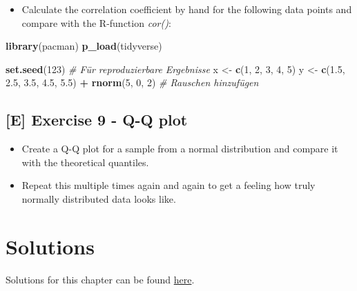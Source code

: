 \documentclass[
]{book}
\newenvironment{Shaded}{\begin{snugshade}}{\end{snugshade}}
\newcommand{\CommentTok}[1]{\textcolor[rgb]{0.56,0.35,0.01}{\textit{#1}}}
\newcommand{\DecValTok}[1]{\textcolor[rgb]{0.00,0.00,0.81}{#1}}
\newcommand{\FloatTok}[1]{\textcolor[rgb]{0.00,0.00,0.81}{#1}}
\newcommand{\FunctionTok}[1]{\textcolor[rgb]{0.13,0.29,0.53}{\textbf{#1}}}
\newcommand{\NormalTok}[1]{#1}
\newcommand{\OtherTok}[1]{\textcolor[rgb]{0.56,0.35,0.01}{#1}}
\newcommand{\SpecialCharTok}[1]{\textcolor[rgb]{0.81,0.36,0.00}{\textbf{#1}}}
\providecommand{\tightlist}{%
  \setlength{\itemsep}{0pt}\setlength{\parskip}{0pt}}
\begin{document}
\begin{itemize}
\tightlist
\item
  Calculate the correlation coefficient by hand for the following
  data points and compare with the R-function \emph{cor()}:
\end{itemize}

\begin{Shaded}
\begin{Highlighting}[]
\FunctionTok{library}\NormalTok{(pacman)}
\FunctionTok{p\_load}\NormalTok{(tidyverse)}

\FunctionTok{set.seed}\NormalTok{(}\DecValTok{123}\NormalTok{) }\CommentTok{\# Für reproduzierbare Ergebnisse}
\NormalTok{x }\OtherTok{\textless{}{-}} \FunctionTok{c}\NormalTok{(}\DecValTok{1}\NormalTok{, }\DecValTok{2}\NormalTok{, }\DecValTok{3}\NormalTok{, }\DecValTok{4}\NormalTok{, }\DecValTok{5}\NormalTok{)}
\NormalTok{y }\OtherTok{\textless{}{-}} \FunctionTok{c}\NormalTok{(}\FloatTok{1.5}\NormalTok{, }\FloatTok{2.5}\NormalTok{, }\FloatTok{3.5}\NormalTok{, }\FloatTok{4.5}\NormalTok{, }\FloatTok{5.5}\NormalTok{) }\SpecialCharTok{+} \FunctionTok{rnorm}\NormalTok{(}\DecValTok{5}\NormalTok{, }\DecValTok{0}\NormalTok{, }\DecValTok{2}\NormalTok{) }\CommentTok{\# Rauschen hinzufügen}
\end{Highlighting}
\end{Shaded}

\subsection{{[}E{]} Exercise 9 - Q-Q plot}\label{exercise9_descriptive_stats}

\begin{itemize}
\tightlist
\item
  Create a Q-Q plot for a sample from a normal distribution and compare it with the theoretical quantiles.
\item
  Repeat this multiple times again and again to get a feeling how truly normally distributed data looks like.
\end{itemize}

\section{Solutions}\label{solutions-1}

Solutions for this chapter can be found \href{https://github.com/jdegenfellner/Script_QM1_ZHAW/tree/main/Solutions_to_Exercises/3_Descriptive_statistics}{here}.
\end{document}
